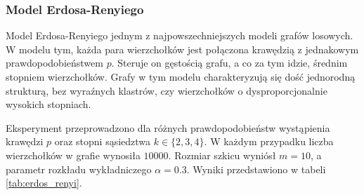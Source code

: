     \subsubsection{Model Erdosa-Renyiego}
        Model Erdosa-Renyiego jednym z najpowszechniejszych modeli grafów losowych. W modelu tym, każda para wierzchołków jest połączona krawędzią z jednakowym prawdopodobieństwem $p$. Steruje on gęstością grafu, a co za tym idzie, średnim stopniem wierzchołków. Grafy w tym modelu charakteryzują się dość jednorodną strukturą, bez wyraźnych klastrów, czy wierzchołków o dysproporcjonalnie wysokich stopniach. 

        Eksperyment przeprowadzono dla różnych prawdopodobieństw wystąpienia krawędzi $p$ oraz stopni sąsiedztwa $k \in \{2,3,4\}$. W każdym przypadku liczba wierzchołków w grafie wynosiła $10000$. Rozmiar szkicu wyniósł $m = 10$, a parametr rozkładu wykładniczego $\alpha = 0.3$. Wyniki przedstawiono w tabeli \ref{tab:erdos_renyi}.

